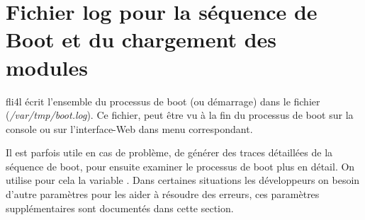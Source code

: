 
\section{Fichier log pour la séquence de Boot et du chargement des modules}

    fli4l écrit l'ensemble du processus de boot (ou démarrage) dans le fichier
    (\emph{/var/tmp/boot.log}). Ce fichier, peut être vu à la fin du processus de
    boot sur la console ou sur l'interface-Web dans menu correspondant.

    Il est parfois utile en cas de problème, de générer des traces détaillées de
    la séquence de boot, pour ensuite examiner le processus de boot plus en
    détail. On utilise pour cela la variable .
    Dans certaines situations les développeurs on besoin d'autre paramètres pour
    les aider à résoudre des erreurs, ces paramètres supplémentaires sont
    documentés dans cette section.


